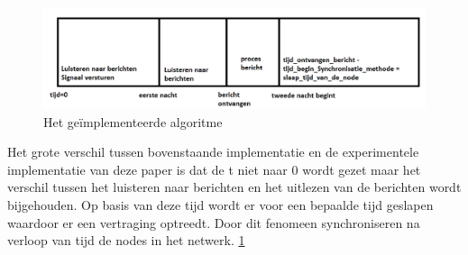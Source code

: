 \documentclass{article}
\begin{document}
\begin{figure}[h]
\centering\includegraphics[scale=0.5]{Onze_implementatie}
\caption{Het ge\"{i}mplementeerde algoritme}
\label{fig: Onze_implementatie}
\end{figure}
Het grote verschil tussen bovenstaande implementatie en de experimentele implementatie van deze paper is dat de t niet naar 0 wordt gezet maar het verschil tussen het luisteren naar berichten en het uitlezen van de berichten wordt bijgehouden. Op basis van deze tijd wordt er voor een bepaalde tijd geslapen waardoor er een vertraging optreedt. Door dit fenomeen synchroniseren na verloop van tijd de nodes in het netwerk. 
\ref{fig: Onze_implementatie}
\end{document}
